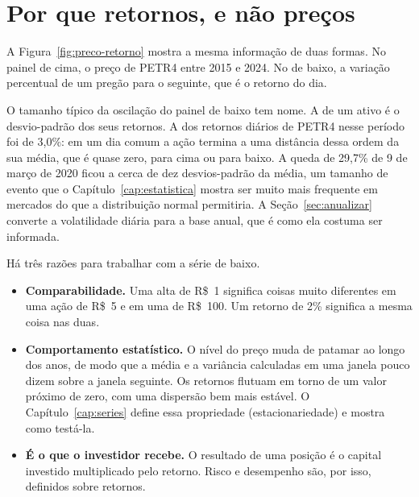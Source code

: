 \section{Por que retornos, e não preços}

A Figura~\ref{fig:preco-retorno} mostra a mesma informação de duas formas. No painel de cima, o preço de PETR4 entre 2015 e 2024. No de baixo, a variação percentual de um pregão para o seguinte, que é o retorno do dia.


O tamanho típico da oscilação do painel de baixo tem nome. A  de um ativo é o desvio-padrão dos seus retornos. A dos retornos diários de PETR4 nesse período foi de 3,0\%: em um dia comum a ação termina a uma distância dessa ordem da sua média, que é quase zero, para cima ou para baixo. A queda de 29,7\% de 9 de março de 2020 ficou a cerca de dez desvios-padrão da média, um tamanho de evento que o Capítulo~\ref{cap:estatistica} mostra ser muito mais frequente em mercados do que a distribuição normal permitiria. A Seção~\ref{sec:anualizar} converte a volatilidade diária para a base anual, que é como ela costuma ser informada.

Há três razões para trabalhar com a série de baixo.

\begin{itemize}
  \item \textbf{Comparabilidade.} Uma alta de R\$~1 significa coisas muito diferentes em uma ação de R\$~5 e em uma de R\$~100. Um retorno de 2\% significa a mesma coisa nas duas.
  \item \textbf{Comportamento estatístico.} O nível do preço muda de patamar ao longo dos anos, de modo que a média e a variância calculadas em uma janela pouco dizem sobre a janela seguinte. Os retornos flutuam em torno de um valor próximo de zero, com uma dispersão bem mais estável. O Capítulo~\ref{cap:series} define essa propriedade (estacionariedade) e mostra como testá-la.
  \item \textbf{É o que o investidor recebe.} O resultado de uma posição é o capital investido multiplicado pelo retorno. Risco e desempenho são, por isso, definidos sobre retornos.
\end{itemize}

